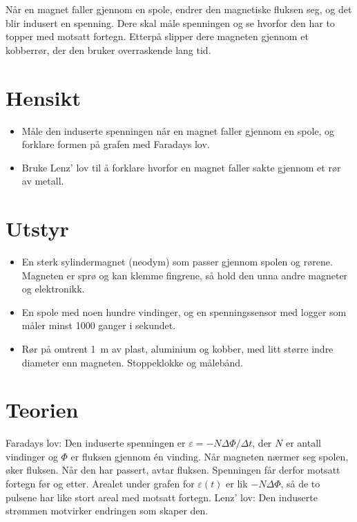 \documentclass[11pt]{article}
\begin{document}

Når en magnet faller gjennom en spole, endrer den magnetiske fluksen seg, og det blir indusert en spenning. Dere skal måle spenningen og se hvorfor den har to topper med motsatt fortegn. Etterpå slipper dere magneten gjennom et kobberrør, der den bruker overraskende lang tid.

\section*{Hensikt}

\begin{itemize}
\item Måle den induserte spenningen når en magnet faller gjennom en spole, og forklare formen på grafen med Faradays lov.
\item Bruke Lenz' lov til å forklare hvorfor en magnet faller sakte gjennom et rør av metall.
\end{itemize}

\section*{Utstyr}

\begin{itemize}
\item En sterk sylindermagnet (neodym) som passer gjennom spolen og rørene. Magneten er sprø og kan klemme fingrene, så hold den unna andre magneter og elektronikk.
\item En spole med noen hundre vindinger, og en spenningssensor med logger som måler minst 1000 ganger i sekundet.
\item Rør på omtrent 1~m av plast, aluminium og kobber, med litt større indre diameter enn magneten. Stoppeklokke og målebånd.
\end{itemize}

\section*{Teorien}

Faradays lov: Den induserte spenningen er $ε = -NΔΦ/Δt$, der $N$ er antall vindinger og $Φ$ er fluksen gjennom én vinding. Når magneten nærmer seg spolen, øker fluksen. Når den har passert, avtar fluksen. Spenningen får derfor motsatt fortegn før og etter. Arealet under grafen for $ε(t)$ er lik $-NΔΦ$, så de to pulsene har like stort areal med motsatt fortegn. Lenz' lov: Den induserte strømmen motvirker endringen som skaper den.
\end{document}
